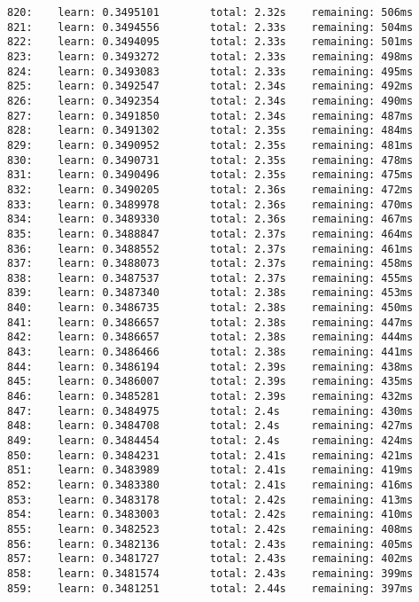 \documentclass[11pt]{article}
\begin{document}
\begin{Verbatim}[commandchars=\\\{\}]
820:    learn: 0.3495101        total: 2.32s    remaining: 506ms
821:    learn: 0.3494556        total: 2.33s    remaining: 504ms
822:    learn: 0.3494095        total: 2.33s    remaining: 501ms
823:    learn: 0.3493272        total: 2.33s    remaining: 498ms
824:    learn: 0.3493083        total: 2.33s    remaining: 495ms
825:    learn: 0.3492547        total: 2.34s    remaining: 492ms
826:    learn: 0.3492354        total: 2.34s    remaining: 490ms
827:    learn: 0.3491850        total: 2.34s    remaining: 487ms
828:    learn: 0.3491302        total: 2.35s    remaining: 484ms
829:    learn: 0.3490952        total: 2.35s    remaining: 481ms
830:    learn: 0.3490731        total: 2.35s    remaining: 478ms
831:    learn: 0.3490496        total: 2.35s    remaining: 475ms
832:    learn: 0.3490205        total: 2.36s    remaining: 472ms
833:    learn: 0.3489978        total: 2.36s    remaining: 470ms
834:    learn: 0.3489330        total: 2.36s    remaining: 467ms
835:    learn: 0.3488847        total: 2.37s    remaining: 464ms
836:    learn: 0.3488552        total: 2.37s    remaining: 461ms
837:    learn: 0.3488073        total: 2.37s    remaining: 458ms
838:    learn: 0.3487537        total: 2.37s    remaining: 455ms
839:    learn: 0.3487340        total: 2.38s    remaining: 453ms
840:    learn: 0.3486735        total: 2.38s    remaining: 450ms
841:    learn: 0.3486657        total: 2.38s    remaining: 447ms
842:    learn: 0.3486657        total: 2.38s    remaining: 444ms
843:    learn: 0.3486466        total: 2.38s    remaining: 441ms
844:    learn: 0.3486194        total: 2.39s    remaining: 438ms
845:    learn: 0.3486007        total: 2.39s    remaining: 435ms
846:    learn: 0.3485281        total: 2.39s    remaining: 432ms
847:    learn: 0.3484975        total: 2.4s     remaining: 430ms
848:    learn: 0.3484708        total: 2.4s     remaining: 427ms
849:    learn: 0.3484454        total: 2.4s     remaining: 424ms
850:    learn: 0.3484231        total: 2.41s    remaining: 421ms
851:    learn: 0.3483989        total: 2.41s    remaining: 419ms
852:    learn: 0.3483380        total: 2.41s    remaining: 416ms
853:    learn: 0.3483178        total: 2.42s    remaining: 413ms
854:    learn: 0.3483003        total: 2.42s    remaining: 410ms
855:    learn: 0.3482523        total: 2.42s    remaining: 408ms
856:    learn: 0.3482136        total: 2.43s    remaining: 405ms
857:    learn: 0.3481727        total: 2.43s    remaining: 402ms
858:    learn: 0.3481574        total: 2.43s    remaining: 399ms
859:    learn: 0.3481251        total: 2.44s    remaining: 397ms

\end{Verbatim}
\end{document}
